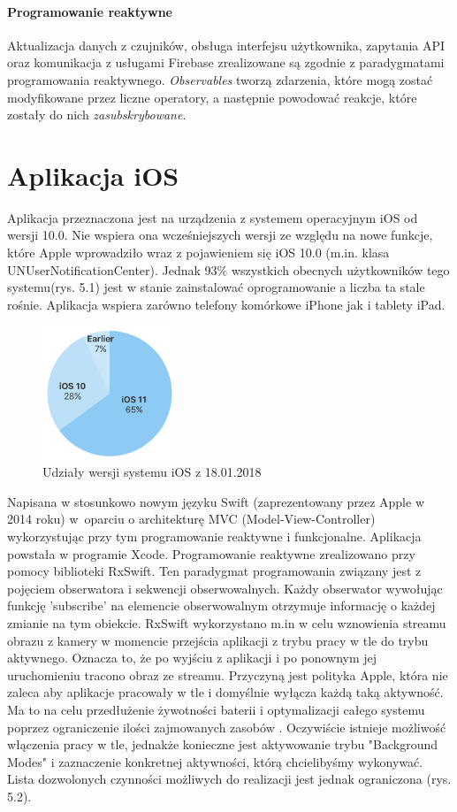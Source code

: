 \paragraph{Programowanie reaktywne} Aktualizacja danych z czujników, obsługa interfejsu użytkownika, zapytania API oraz komunikacja z usługami Firebase zrealizowane są zgodnie z paradygmatami programowania reaktywnego.
\textit{Observables} tworzą zdarzenia, które mogą zostać modyfikowane przez liczne operatory, a następnie powodować reakcje, które zostały do nich \textit{zasubskrybowane}.

\section{Aplikacja iOS}
Aplikacja przeznaczona jest na urządzenia z systemem operacyjnym iOS od wersji 10.0. 
Nie wspiera ona wcześniejszych wersji ze względu na nowe funkcje, które Apple wprowadziło wraz z pojawieniem się iOS 10.0 (m.in. klasa UNUserNotificationCenter). Jednak 93\% wszystkich obecnych użytkowników tego systemu(rys. 5.1) jest w stanie zainstalować oprogramowanie a liczba ta stale rośnie. Aplikacja wspiera zarówno telefony komórkowe iPhone jak i tablety iPad. 
\begin{figure}[H]
	\centering
	\includegraphics[width=4cm]{ios_screenshots/iOSstat.png}
	\caption{Udziały wersji systemu iOS z 18.01.2018 \protect\cite{iosversions}}
\end{figure}
Napisana w stosunkowo nowym języku Swift (zaprezentowany przez Apple w 2014 roku) w~oparciu o architekturę MVC (Model-View-Controller) wykorzystując przy tym programowanie reaktywne i funkcjonalne. Aplikacja powstała w programie Xcode. Programowanie reaktywne zrealizowano przy pomocy biblioteki RxSwift. Ten paradygmat programowania związany jest z pojęciem obserwatora i sekwencji obserwowalnych. Każdy obserwator wywołując funkcję 'subscribe' na elemencie obserwowalnym otrzymuje informację o każdej zmianie na tym obiekcie. RxSwift wykorzystano m.in w celu wznowienia streamu obrazu z kamery w momencie przejścia aplikacji z trybu pracy w tle do trybu aktywnego. Oznacza to, że po wyjściu z aplikacji i po ponownym jej uruchomieniu tracono obraz ze streamu. Przyczyną jest polityka Apple, która nie zaleca aby aplikacje pracowały w tle i domyślnie wyłącza każdą taką aktywność. Ma to na celu przedłużenie żywotności baterii i optymalizacji całego systemu poprzez ograniczenie ilości zajmowanych zasobów \cite{backgroundmodes}.  Oczywiście istnieje możliwość włączenia pracy w tle, jednakże konieczne jest aktywowanie trybu "Background Modes" i zaznaczenie konkretnej aktywności, którą chcielibyśmy wykonywać. Lista dozwolonych czynności możliwych do realizacji jest jednak ograniczona (rys. 5.2). 
